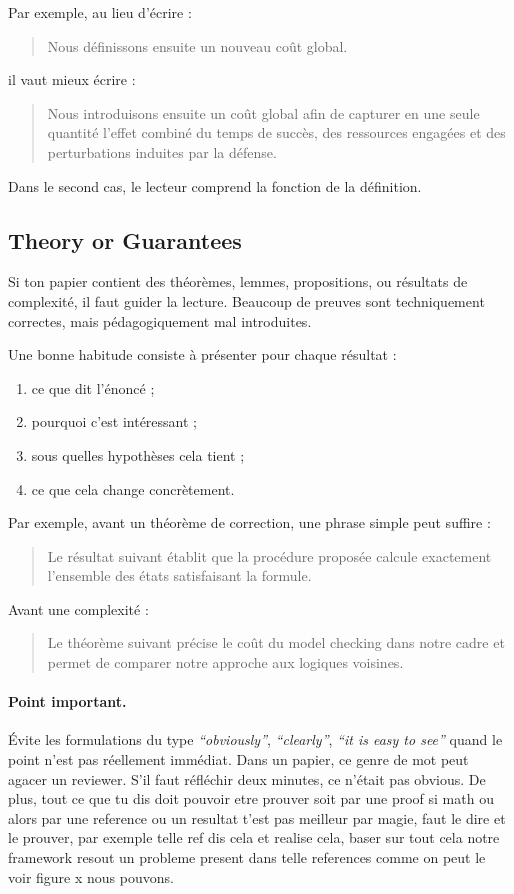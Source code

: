 \documentclass[11pt,a4paper]{article}
\theoremstyle{definition}
\begin{document}
Par exemple, au lieu d'écrire :
\begin{quote}
Nous définissons ensuite un nouveau coût global.
\end{quote}

il vaut mieux écrire :
\begin{quote}
Nous introduisons ensuite un coût global afin de capturer en une seule quantité l'effet combiné du temps de succès, des ressources engagées et des perturbations induites par la défense.
\end{quote}

Dans le second cas, le lecteur comprend la fonction de la définition.


\subsection*{Theory or Guarantees}

Si ton papier contient des théorèmes, lemmes, propositions, ou résultats de complexité, il faut guider la lecture. Beaucoup de preuves sont techniquement correctes, mais pédagogiquement mal introduites.

Une bonne habitude consiste à présenter pour chaque résultat :
\begin{enumerate}[label=\arabic*.]
    \item ce que dit l'énoncé ;
    \item pourquoi c'est intéressant ;
    \item sous quelles hypothèses cela tient ;
    \item ce que cela change concrètement.
\end{enumerate}

Par exemple, avant un théorème de correction, une phrase simple peut suffire :
\begin{quote}
Le résultat suivant établit que la procédure proposée calcule exactement l'ensemble des états satisfaisant la formule.
\end{quote}

Avant une complexité :
\begin{quote}
Le théorème suivant précise le coût du model checking dans notre cadre et permet de comparer notre approche aux logiques voisines.
\end{quote}

\paragraph{Point important.}
Évite les formulations du type \textit{``obviously''}, \textit{``clearly''}, \textit{``it is easy to see''} quand le point n'est pas réellement immédiat. Dans un papier, ce genre de mot peut agacer un reviewer. S'il faut réfléchir deux minutes, ce n'était pas obvious. De plus, tout ce que tu dis doit pouvoir etre prouver soit par une proof si math ou alors par une reference ou un resultat t'est pas meilleur par magie, faut le dire et le prouver, par exemple telle ref dis cela et realise cela, baser sur tout cela notre framework resout un probleme present dans telle references comme on peut le voir figure x nous pouvons.
\end{document}
